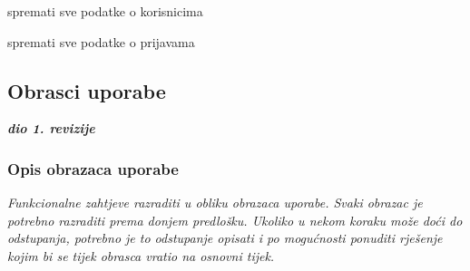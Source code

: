 \begin{packed_enum}
				\item  {}
				\begin{packed_enum}
					\item spremati sve podatke o korisnicima
					\item spremati sve podatke o prijavama
				\end{packed_enum}
				
			\end{packed_enum}
						
			\eject 
			
				
						
			\subsection{Obrasci uporabe}
				
				\textbf{\textit{dio 1. revizije}}
				
				\subsubsection{Opis obrazaca uporabe}
					\textit{Funkcionalne zahtjeve razraditi u obliku obrazaca uporabe. Svaki obrazac je potrebno razraditi prema donjem predlošku. Ukoliko u nekom koraku može doći do odstupanja, potrebno je to odstupanje opisati i po mogućnosti ponuditi rješenje kojim bi se tijek obrasca vratio na osnovni tijek.}\\
					

